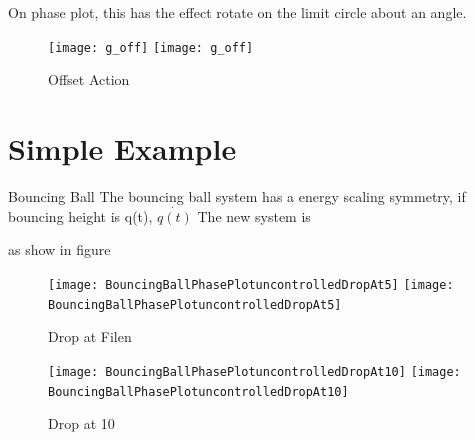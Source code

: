 On phase plot, this has the effect rotate on the limit circle about an angle.


\begin{figure}[!htbp]
  \begin{center}
    \leavevmode
    \ifpdf
      \texttt{[image: g\_off]}
    \else
      \texttt{[image: g\_off]}
    \fi
    \caption{Offset Action}
    \label{fig:goff}
\end{center}
\end{figure}





\section{Simple Example}
Bouncing Ball
The bouncing ball system has a energy scaling symmetry, if bouncing height is q(t), $\dot{q(t)}$
The new system is 

as show in figure

\begin{figure}[!htbp]
  \begin{center}
    \leavevmode
    \ifpdf
      \texttt{[image: BouncingBallPhasePlotuncontrolledDropAt5]}
    \else
      \texttt{[image: BouncingBallPhasePlotuncontrolledDropAt5]}
    \fi
    \caption{Drop at Filen}
    \label{fig:bouncing5}
\end{center}
\end{figure}


\begin{figure}[!htbp]
  \begin{center}
    \leavevmode
    \ifpdf
      \texttt{[image: BouncingBallPhasePlotuncontrolledDropAt10]}
    \else
      \texttt{[image: BouncingBallPhasePlotuncontrolledDropAt10]}
    \fi
    \caption{Drop at 10}
    \label{fig:bouncing5}
\end{center}
\end{figure}
